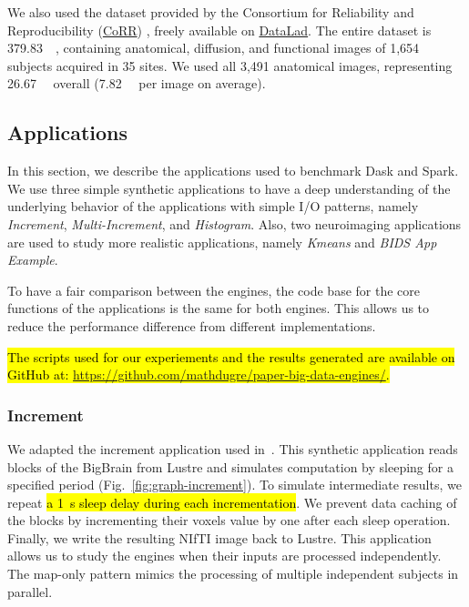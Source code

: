 \documentclass[AMA,STIX1COL]{WileyNJD-v2}
\newcommand{\HL}[1]{\hl{#1}}
\begin{document}
We also used the dataset provided by the Consortium for Reliability and
Reproducibility
(\href{http://fcon_1000.projects.nitrc.org/indi/CoRR/html/}{CoRR})
\cite{zuo2014open}, freely available on
\href{https://datasets.datalad.org/?dir=/corr/RawDataBIDS}{DataLad}.
The entire dataset is \SI{379.83}{\gibi\byte}, containing anatomical, diffusion,
and functional images of 1,654 subjects acquired in 35 sites.
We used all 3,491 anatomical images, representing \SI{26.67}{\gibi\byte} overall
(\SI{7.82}{\mebi\byte} per image on average).
				
\subsection{Applications}
In this section, we describe the applications used to benchmark Dask and Spark.
We use three simple synthetic applications to have a deep understanding of the 
underlying behavior of the applications with simple I/O patterns, namely
\textit{Increment}, \textit{Multi-Increment}, and \textit{Histogram}.
Also, two neuroimaging applications are used to study more realistic 
applications, namely \textit{Kmeans} and \textit{BIDS App Example}\HL{{\cite{gorgolewski2017bids}}}.
				
To have a fair comparison between the engines, the code base for the core functions of the applications is the same for both engines.
This allows us to reduce the performance difference from different implementations.
		
\HL{The scripts used for our experiements and the results generated are available on
	GitHub at: \mbox{\href{https://github.com/mathdugre/paper-big-data-engines}{https://github.com/mathdugre/paper-big-data-engines/}}.}
		
\subsubsection{Increment}
We adapted the increment application used in~\cite{8752675}.
This synthetic application reads blocks of the BigBrain from Lustre and
simulates computation by sleeping for a specified period (Fig.~\ref{fig:graph-increment}). To simulate
intermediate results, we repeat \HL{a {\SI{1}{\second}} sleep delay during each incrementation}.
We prevent data caching of the blocks by incrementing their voxels
value by one after each sleep operation. Finally, we write the resulting
NIfTI image back to Lustre. This application allows us to study the engines
when their inputs are processed independently. The map-only pattern
mimics the processing of multiple independent subjects in parallel.
							
\end{document}
